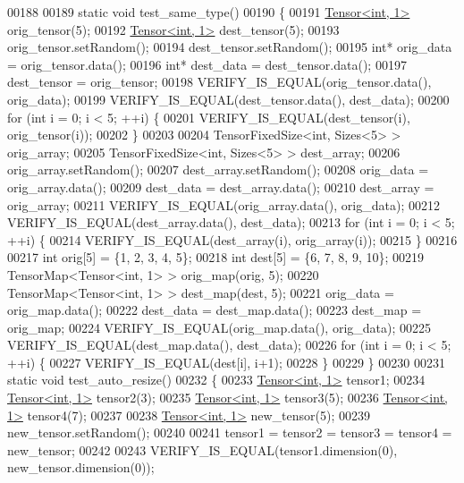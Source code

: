 \begin{DoxyCode}
00188 
00189 \textcolor{keyword}{static} \textcolor{keywordtype}{void} test\_same\_type()
00190 \{
00191   \hyperlink{class_eigen_1_1_tensor}{Tensor<int, 1>} orig\_tensor(5);
00192   \hyperlink{class_eigen_1_1_tensor}{Tensor<int, 1>} dest\_tensor(5);
00193   orig\_tensor.setRandom();
00194   dest\_tensor.setRandom();
00195   \textcolor{keywordtype}{int}* orig\_data = orig\_tensor.data();
00196   \textcolor{keywordtype}{int}* dest\_data = dest\_tensor.data();
00197   dest\_tensor = orig\_tensor;
00198   VERIFY\_IS\_EQUAL(orig\_tensor.data(), orig\_data);
00199   VERIFY\_IS\_EQUAL(dest\_tensor.data(), dest\_data);
00200   \textcolor{keywordflow}{for} (\textcolor{keywordtype}{int} i = 0; i < 5; ++i) \{
00201     VERIFY\_IS\_EQUAL(dest\_tensor(i), orig\_tensor(i));
00202   \}
00203 
00204   TensorFixedSize<int, Sizes<5> > orig\_array;
00205   TensorFixedSize<int, Sizes<5> > dest\_array;
00206   orig\_array.setRandom();
00207   dest\_array.setRandom();
00208   orig\_data = orig\_array.data();
00209   dest\_data = dest\_array.data();
00210   dest\_array = orig\_array;
00211   VERIFY\_IS\_EQUAL(orig\_array.data(), orig\_data);
00212   VERIFY\_IS\_EQUAL(dest\_array.data(), dest\_data);
00213   \textcolor{keywordflow}{for} (\textcolor{keywordtype}{int} i = 0; i < 5; ++i) \{
00214     VERIFY\_IS\_EQUAL(dest\_array(i), orig\_array(i));
00215   \}
00216 
00217   \textcolor{keywordtype}{int} orig[5] = \{1, 2, 3, 4, 5\};
00218   \textcolor{keywordtype}{int} dest[5] = \{6, 7, 8, 9, 10\};
00219   TensorMap<Tensor<int, 1> > orig\_map(orig, 5);
00220   TensorMap<Tensor<int, 1> > dest\_map(dest, 5);
00221   orig\_data = orig\_map.data();
00222   dest\_data = dest\_map.data();
00223   dest\_map = orig\_map;
00224   VERIFY\_IS\_EQUAL(orig\_map.data(), orig\_data);
00225   VERIFY\_IS\_EQUAL(dest\_map.data(), dest\_data);
00226   \textcolor{keywordflow}{for} (\textcolor{keywordtype}{int} i = 0; i < 5; ++i) \{
00227     VERIFY\_IS\_EQUAL(dest[i], i+1);
00228   \}
00229 \}
00230 
00231 \textcolor{keyword}{static} \textcolor{keywordtype}{void} test\_auto\_resize()
00232 \{
00233   \hyperlink{class_eigen_1_1_tensor}{Tensor<int, 1>} tensor1;
00234   \hyperlink{class_eigen_1_1_tensor}{Tensor<int, 1>} tensor2(3);
00235   \hyperlink{class_eigen_1_1_tensor}{Tensor<int, 1>} tensor3(5);
00236   \hyperlink{class_eigen_1_1_tensor}{Tensor<int, 1>} tensor4(7);
00237 
00238   \hyperlink{class_eigen_1_1_tensor}{Tensor<int, 1>} new\_tensor(5);
00239   new\_tensor.setRandom();
00240 
00241   tensor1 = tensor2 = tensor3 = tensor4 = new\_tensor;
00242 
00243   VERIFY\_IS\_EQUAL(tensor1.dimension(0), new\_tensor.dimension(0));

\end{DoxyCode}
